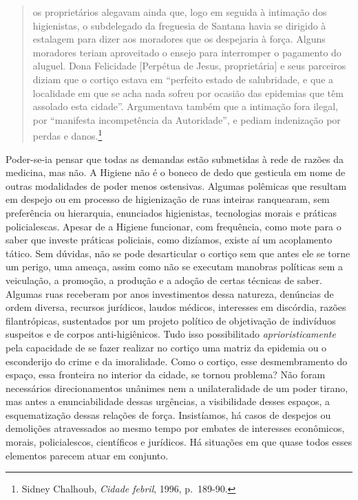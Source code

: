 \begin{quote}
os proprietários alegavam ainda que, logo em seguida à intimação dos
higienistas, o subdelegado da freguesia de Santana havia se dirigido à
estalagem para dizer aos moradores que os despejaria à força. Alguns
moradores teriam aproveitado o ensejo para interromper o pagamento do
aluguel. Dona Felicidade {[}Perpétua de Jesus, proprietária{]} e seus
parceiros diziam que o cortiço estava em ``perfeito estado de
salubridade, e que a localidade em que se acha nada sofreu por ocasião
das epidemias que têm assolado esta cidade''. Argumentava também que a
intimação fora ilegal, por ``manifesta incompetência da Autoridade'', e
pediam indenização por perdas e danos.\footnote{Sidney Chalhoub,
  \textit{Cidade febril}, 1996, p.~189-90.}
\end{quote}

Poder-se-ia pensar que todas as demandas estão submetidas à rede de
razões da medicina, mas não. A Higiene não é o boneco de dedo que
gesticula em nome de outras modalidades de poder menos ostensivas.
Algumas polêmicas que resultam em despejo ou em processo de higienização
de ruas inteiras ranquearam, sem preferência ou hierarquia, enunciados
higienistas, tecnologias morais e práticas policialescas. Apesar de a
Higiene funcionar, com frequência, como mote para o saber que investe
práticas policiais, como dizíamos, existe aí um acoplamento tático. Sem
dúvidas, não se pode desarticular o cortiço sem que antes ele se torne
um perigo, uma ameaça, assim como não se executam manobras políticas sem
a veiculação, a promoção, a produção e a adoção de certas técnicas de
saber. Algumas ruas receberam por anos investimentos dessa natureza,
denúncias de ordem diversa, recursos jurídicos, laudos médicos,
interesses em discórdia, razões filantrópicas, sustentados por um
projeto político de objetivação de indivíduos suspeitos e de corpos
anti-higiênicos. Tudo isso possibilitado \textit{aprioristicamente} pela
capacidade de se fazer realizar no cortiço uma matriz da epidemia ou o
esconderijo do crime e da imoralidade. Como o cortiço, esse
desmembramento do espaço, essa fronteira no interior da cidade, se
tornou problema? Não foram necessários direcionamentos unânimes nem a
unilateralidade de um poder tirano, mas antes a enunciabilidade dessas
urgências, a visibilidade desses espaços, a esquematização dessas
relações de força. Insistíamos, há casos de despejos ou demolições
atravessados ao mesmo tempo por embates de interesses econômicos,
morais, policialescos, científicos e jurídicos. Há situações em que
quase todos esses elementos parecem atuar em conjunto.

